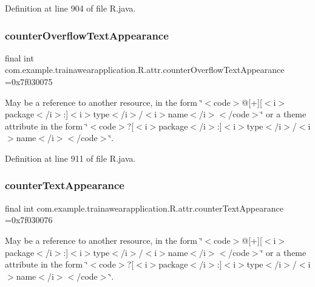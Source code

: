 Definition at line 904 of file R.\+java.

\mbox{\label{classcom_1_1example_1_1trainawearapplication_1_1_r_1_1attr_adbd448cc9d5deada4e2cbd14d65ab52b}} 
\subsubsection{\texorpdfstring{counterOverflowTextAppearance}{counterOverflowTextAppearance}}
{\footnotesize\ttfamily final int com.\+example.\+trainawearapplication.\+R.\+attr.\+counter\+Overflow\+Text\+Appearance =0x7f030075\hspace{0.3cm}{\ttfamily [static]}}

May be a reference to another resource, in the form \char`\"{}$<$code$>$@\mbox{[}+\mbox{]}\mbox{[}$<$i$>$package$<$/i$>$\+:\mbox{]}$<$i$>$type$<$/i$>$/$<$i$>$name$<$/i$>$$<$/code$>$\char`\"{} or a theme attribute in the form \char`\"{}$<$code$>$?\mbox{[}$<$i$>$package$<$/i$>$\+:\mbox{]}$<$i$>$type$<$/i$>$/$<$i$>$name$<$/i$>$$<$/code$>$\char`\"{}. 

Definition at line 911 of file R.\+java.

\mbox{\label{classcom_1_1example_1_1trainawearapplication_1_1_r_1_1attr_abc088cec0bc3584a65ff813560170f4f}} 
\subsubsection{\texorpdfstring{counterTextAppearance}{counterTextAppearance}}
{\footnotesize\ttfamily final int com.\+example.\+trainawearapplication.\+R.\+attr.\+counter\+Text\+Appearance =0x7f030076\hspace{0.3cm}{\ttfamily [static]}}

May be a reference to another resource, in the form \char`\"{}$<$code$>$@\mbox{[}+\mbox{]}\mbox{[}$<$i$>$package$<$/i$>$\+:\mbox{]}$<$i$>$type$<$/i$>$/$<$i$>$name$<$/i$>$$<$/code$>$\char`\"{} or a theme attribute in the form \char`\"{}$<$code$>$?\mbox{[}$<$i$>$package$<$/i$>$\+:\mbox{]}$<$i$>$type$<$/i$>$/$<$i$>$name$<$/i$>$$<$/code$>$\char`\"{}. 

